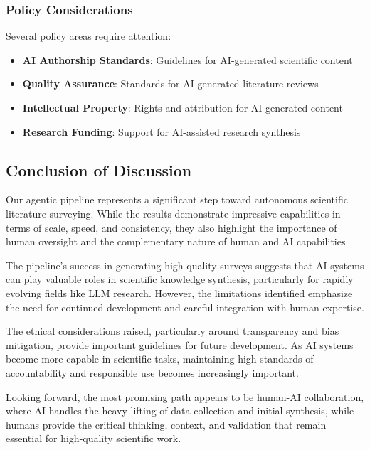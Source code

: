 \subsubsection{Policy Considerations}

Several policy areas require attention:

\begin{itemize}
    \item \textbf{AI Authorship Standards}: Guidelines for AI-generated scientific content
    \item \textbf{Quality Assurance}: Standards for AI-generated literature reviews
    \item \textbf{Intellectual Property}: Rights and attribution for AI-generated content
    \item \textbf{Research Funding}: Support for AI-assisted research synthesis
\end{itemize}

\subsection{Conclusion of Discussion}

Our agentic pipeline represents a significant step toward autonomous scientific literature surveying. While the results demonstrate impressive capabilities in terms of scale, speed, and consistency, they also highlight the importance of human oversight and the complementary nature of human and AI capabilities.

The pipeline's success in generating high-quality surveys suggests that AI systems can play valuable roles in scientific knowledge synthesis, particularly for rapidly evolving fields like LLM research. However, the limitations identified emphasize the need for continued development and careful integration with human expertise.

The ethical considerations raised, particularly around transparency and bias mitigation, provide important guidelines for future development. As AI systems become more capable in scientific tasks, maintaining high standards of accountability and responsible use becomes increasingly important.

Looking forward, the most promising path appears to be human-AI collaboration, where AI handles the heavy lifting of data collection and initial synthesis, while humans provide the critical thinking, context, and validation that remain essential for high-quality scientific work.

